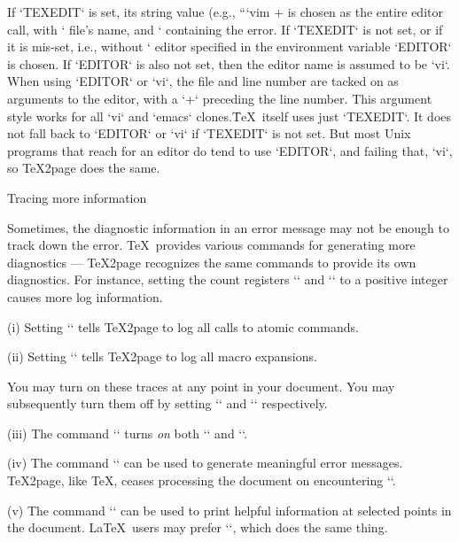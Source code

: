 {{{{{{{{{If `TEXEDIT` is set, its string value (e.g.,
“`vim +%
is chosen as
the entire editor call, with `%
file’s name, and `%
containing the error.
If `TEXEDIT` is not set, or if
it is mis-set, i.e., without `%
editor specified in the environment variable `EDITOR`
is chosen.  If `EDITOR` is also not set, then
the editor name is assumed to be `vi`.
When using `EDITOR` or `vi`, the file and line number are
tacked on as arguments to the editor,
with a `+` preceding the
line number.  This argument style works for all `vi`
and `emacs` clones.\f{\TeX\ itself uses just `TEXEDIT`.
It does not fall back to `EDITOR` or `vi` if
`TEXEDIT` is not set.  But most Unix programs that
reach for an editor do tend to use `EDITOR`, and failing that,
`vi`, so \TeX2page does the same.}

\beginsection Tracing more information

%
Sometimes, the diagnostic information in an error
message may not be enough to track
down the error.
\TeX\ provides various commands for generating more diagnostics —
\TeX2page recognizes the same commands to provide its own diagnostics.
For instance,
setting the count registers
`\tracingcommands` and `\tracingmacros` to a positive integer causes
more log information.

(i) Setting  `` tells \TeX2page to log all calls
to atomic commands.

(ii) Setting  `` tells
\TeX2page to log all macro expansions.

You may turn on
these traces at any point in your document.  You may
subsequently turn them off by setting ``
and `` respectively.


(iii) The command `\tracingall` turns {\em on} both
`\tracingcommands` and `\tracingmacros`.


(iv) The command `\errmessage` can be used to generate
meaningful error messages.  \TeX2page, like \TeX, ceases
processing the document on encountering
`\errmessage`.


(v) The command `\message`
can be used to print helpful information at selected
points in the document.   \LaTeX\ users may
prefer `\typeout`, which does the same thing.

}}}}}}}}}
